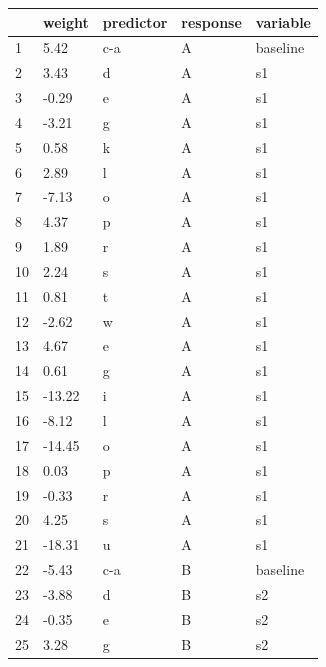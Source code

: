 \begin{table}[!htpb]
    \centering
    \small
\renewcommand{\arraystretch}{0.90}%
  \begin{tabular}{lllll}
    \lsptoprule
       & weight & predictor & response & variable \\
    \midrule
    1  & 5.42   & c-a       & A        & baseline \\
    2  & 3.43   & d         & A        & s1       \\
    3  & -0.29  & e         & A        & s1       \\
    4  & -3.21  & g         & A        & s1       \\
    5  & 0.58   & k         & A        & s1       \\
    6  & 2.89   & l         & A        & s1       \\
    7  & -7.13  & o         & A        & s1       \\
    8  & 4.37   & p         & A        & s1       \\
    9  & 1.89   & r         & A        & s1       \\
    10 & 2.24   & s         & A        & s1       \\
    11 & 0.81   & t         & A        & s1       \\
    12 & -2.62  & w         & A        & s1       \\
    13 & 4.67   & e         & A        & s1       \\
    14 & 0.61   & g         & A        & s1       \\
    15 & -13.22 & i         & A        & s1       \\
    16 & -8.12  & l         & A        & s1       \\
    17 & -14.45 & o         & A        & s1       \\
    18 & 0.03   & p         & A        & s1       \\
    19 & -0.33  & r         & A        & s1       \\
    20 & 4.25   & s         & A        & s1       \\
    21 & -18.31 & u         & A        & s1       \\
    22 & -5.43  & c-a       & B        & baseline \\
    23 & -3.88  & d         & B        & s2       \\
    24 & -0.35  & e         & B        & s2       \\
    25 & 3.28   & g         & B        & s2       \\

\end{tabular}
\end{table}
